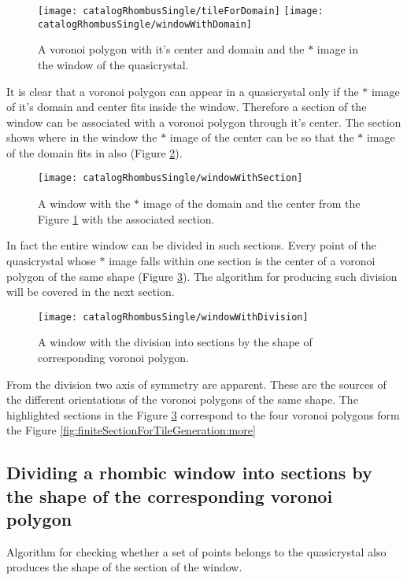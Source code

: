 \documentclass[text.tex]{subfiles}
\begin{document}
\begin{figure}[h]
\centering
\texttt{[image: catalogRhombusSingle/tileForDomain]}
\texttt{[image: catalogRhombusSingle/windowWithDomain]}
\caption{A voronoi polygon with it's center and domain and the $\ast$ image in the window of the quasicrystal.}
\label{fig:windowWithDomain}
\end{figure}

It is clear that a voronoi polygon can appear in a quasicrystal only if the $\ast$ image of it's domain and center fits inside the window. Therefore a section of the window can be associated with a voronoi polygon through it's center. The section shows where in the window the $\ast$ image of the center can be so that the $\ast$ image of the domain fits in also (Figure \ref{fig:windowWithSection}). 

\begin{figure}[h]
\centering
\texttt{[image: catalogRhombusSingle/windowWithSection]}
\caption{A window with the $\ast$ image of the domain and the center from the Figure \ref{fig:windowWithDomain} with the associated section.}
\label{fig:windowWithSection}
\end{figure}

In fact the entire window can be divided in such sections. Every point of the quasicrystal whose $\ast$ image falls within one section is the center of a voronoi polygon of the same shape (Figure \ref{fig:windowWithDivision}). The algorithm for producing such division will be covered in the next section.  

\begin{figure}[h]
\centering
\texttt{[image: catalogRhombusSingle/windowWithDivision]}
\caption{A window with the division into sections by the shape of corresponding voronoi polygon.}
\label{fig:windowWithDivision}
\end{figure}

From the division two axis of symmetry are apparent. These are the sources of the different orientations of the voronoi polygons of the same shape. The highlighted sections in the Figure \ref{fig:windowWithDivision} correspond to the four voronoi polygons form the Figure \ref{fig:finiteSectionForTileGeneration:more}

\subsection{Dividing a rhombic window into sections by the shape of the corresponding voronoi polygon}
Algorithm for checking whether a set of points belongs to the quasicrystal also produces the shape of the section of the window. 
\end{document}
